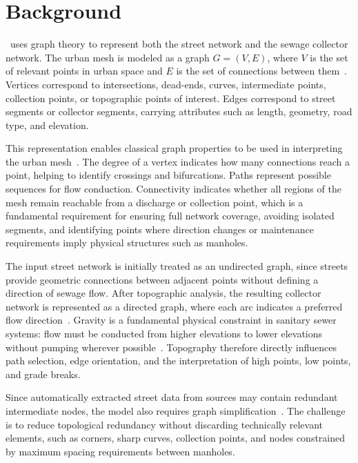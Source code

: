 \section{Background}\label{sec:background}

\method\ uses graph theory to represent both the street network and the sewage collector network.
The urban mesh is modeled as a graph $G=(V,E)$, where $V$ is the set of relevant points in urban space and $E$ is the set of connections between them~\cite{Boeing2017}.
Vertices correspond to intersections, dead-ends, curves, intermediate points, collection points, or topographic points of interest.
Edges correspond to street segments or collector segments, carrying attributes such as length, geometry, road type, and elevation.

This representation enables classical graph properties to be used in interpreting the urban mesh~\cite{Turan2019}.
The degree of a vertex indicates how many connections reach a point, helping to identify crossings and bifurcations.
Paths represent possible sequences for flow conduction.
Connectivity indicates whether all regions of the mesh remain reachable from a discharge or collection point, which is a fundamental requirement for ensuring full network coverage, avoiding isolated segments, and identifying points where direction changes or maintenance requirements imply physical structures such as manholes.

The input street network is initially treated as an undirected graph, since streets provide geometric connections between adjacent points without defining a direction of sewage flow.
After topographic analysis, the resulting collector network is represented as a directed graph, where each arc indicates a preferred flow direction~\cite{Haydar2026}.
Gravity is a fundamental physical constraint in sanitary sewer systems: flow must be conducted from higher elevations to lower elevations without pumping wherever possible~\cite{Turan2019}.
Topography therefore directly influences path selection, edge orientation, and the interpretation of high points, low points, and grade breaks.

Since automatically extracted street data from sources may contain redundant intermediate nodes, the model also requires graph simplification~\cite{Boeing2017}.
The challenge is to reduce topological redundancy without discarding technically relevant elements, such as corners, sharp curves, collection points, and nodes constrained by maximum spacing requirements between manholes.

